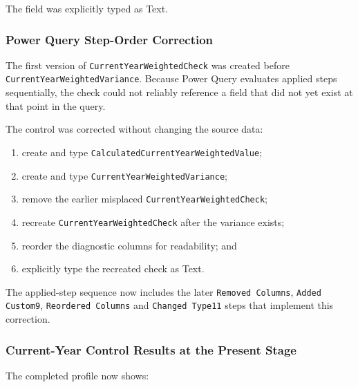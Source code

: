 \documentclass[11pt,a4paper]{article}
\begin{document}
The field was explicitly typed as Text.

\subsubsection*{Power Query Step-Order Correction}

The first version of \texttt{CurrentYearWeightedCheck} was created before
\texttt{CurrentYearWeightedVariance}. Because Power Query evaluates applied
steps sequentially, the check could not reliably reference a field that did not
yet exist at that point in the query.

The control was corrected without changing the source data:

\begin{enumerate}[leftmargin=9mm,itemsep=2pt]
    \item create and type \texttt{CalculatedCurrentYearWeightedValue};
    \item create and type \texttt{CurrentYearWeightedVariance};
    \item remove the earlier misplaced \texttt{CurrentYearWeightedCheck};
    \item recreate \texttt{CurrentYearWeightedCheck} after the variance exists;
    \item reorder the diagnostic columns for readability; and
    \item explicitly type the recreated check as Text.
\end{enumerate}

The applied-step sequence now includes the later
\texttt{Removed Columns}, \texttt{Added Custom9},
\texttt{Reordered Columns} and \texttt{Changed Type11} steps that implement
this correction.

\subsubsection*{Current-Year Control Results at the Present Stage}

The completed profile now shows:
\end{document}
